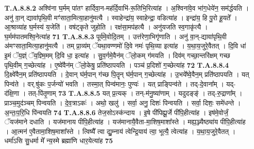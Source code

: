 \documentclass[17pt]{extarticle}
\begin{document}
                                                                  \textbf{ T.A.8.8.2} \newline
                  अश्वि॑ना घ॒र्मम् पा॑तꣳ हार्दिवा॒न-मह॑र्दि॒वाभि॑-रू॒तिभि॒रित्या॑ह । अ॒श्विना॑वे॒व भा॑ग॒धेये॑न॒ सम॑र्द्धयति । अनु॑ वा॒न् द्यावा॑पृथि॒वी मꣳ॑साता॒मित्या॒हानु॑मत्यै ।  स्वाहेन्द्रा॑य॒ स्वाहेन्द्रा॒ वडित्या॑ह ।  इन्द्रा॑य॒ हि पु॒रो हू॒यते᳚ । आ॒श्राव्या॑ह घ॒र्मस्य॑ य॒जेति॑ । वष॑ट्कृते जुहोति । रक्ष॑सा॒मप॑हत्यै । अनु॑यजति स्व॒गाकृ॑त्यै ।  घ॒र्मम॑पातमश्वि॒नेत्या॑ह \textbf{ 71} \newline
                  \newline
                                                                  \textbf{ T.A.8.8.3} \newline
                  पूर्व॑मे॒वोदि॒तम् । उत्त॑रेणा॒भिगृ॑णाति ।  अनु॑ वा॒न्-द्यावा॑पृथि॒वी अ॑मꣳसाता॒मित्या॒हानु॑मत्यै ।  तम् प्रा॒व्य॑म् ॅयथा॒वण्णमो॑ दि॒वे नमः॑ पृथि॒व्या इत्या॑ह । य॒था॒य॒जुरे॒वैतत् । दि॒वि धा॑ इ॒मं ॅय॒ज्ञ्ं ॅय॒ज्ञ्मि॒मम् दि॒वि धा॒ इत्या॑ह ।  सु॒व॒र्गमे॒वैन॑म् ॅलो॒कम् ग॑मयति ।  दिव॑म् गच्छा॒न्तरि॑क्षम् गच्छ पृथि॒वीम् ग॒च्छेत्या॑ह ।  ए॒ष्वे॑वैन॑म् ॅलो॒केषु॒ प्रति॑ष्ठापयति । पञ्च॑ प्र॒दिशो॑ ग॒च्छेत्या॑ह \textbf{ 72} \newline
                  \newline
                                                                  \textbf{ T.A.8.8.4} \newline
                  दि॒क्ष्वे॑वैन॒म् प्रति॑ष्ठापयति ।  दे॒वान् घ॑र्म॒पान् ग॑च्छ पि॒तॄन् घ॑र्म॒पान् ग॒च्छेत्या॑ह । उ॒भये᳚ष्वे॒वैन॒म् प्रति॑ष्ठापयति । यत् पिन्व॑ते । वर्.षु॑कः प॒र्जन्यो॑ भवति । तस्मा॒त् पिन्व॑मानः॒ पुण्यः॑ । यत् प्राङ्पिन्व॑ते । तद्-दे॒वाना᳚म् । यद्-द॑क्षि॒णा । तत्-पि॑तृ॒णाम् \textbf{ 73} \newline
                  \newline
                                                                  \textbf{ T.A.8.8.5} \newline
                  यत् प्र॒त्यक् । तन्-म॑नु॒ष्या॑णाम् । यदुदङ्ङ्॑ । तद्-रु॒द्राणा᳚म् । प्राञ्च॒मुद॑ञ्चम् पिन्वयति । दे॒व॒त्राऽकः॑ । अथो॒ खलु॑ । सर्वा॒ अनु॒ दिशः॑ पिन्वयति । सर्वा॒ दिशः॒ समे॑धन्ते । अ॒न्तः॒प॒रि॒धि पि॑न्वयति \textbf{ 74} \newline
                  \newline
                                                                  \textbf{ T.A.8.8.6} \newline
                  तेज॒सोऽस्क॑न्दाय । इ॒षे पी॑पिह्यू॒र्जे पी॑पि॒हीत्या॑ह ।  इष॑मे॒वोर्जं॒ ॅयज॑माने दधाति । यज॑मानाय पीपि॒हीत्या॑ह । यज॑मानायै॒वैता-मा॒शिष॒माशा᳚स्ते ।  मह्य॒ञ्ज्यैष्ठ्या॑य पीपि॒हीत्या॑ह ।  आ॒त्मन॑ ए॒वैतामा॒शिष॒माशा᳚स्ते ।  त्विष्यै᳚ त्वा द्यु॒म्नाय॑ त्वेन्द्रि॒याय॑ त्वा॒ भूत्यै॒ त्वेत्या॑ह । य॒था॒य॒जुरे॒वैतत् । धर्मा॑ऽसि सु॒धर्मा मे᳚ न्य॒स्मे ब्रह्मा॑णि धार॒येत्या॑ह \textbf{ 75} \newline
\end{document}
